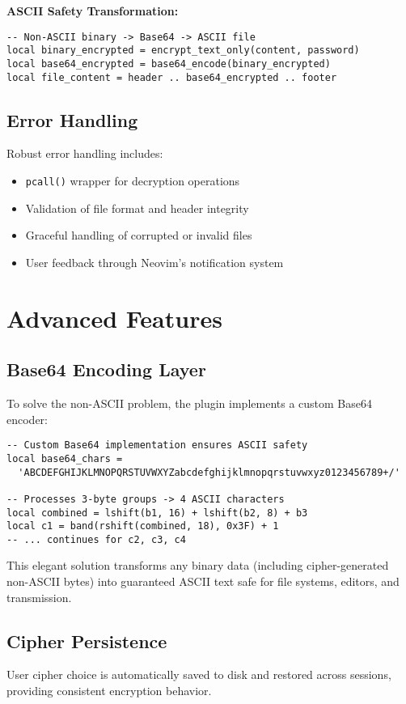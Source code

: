 \documentclass[11pt,a4paper]{article}
\begin{document}
\begin{multicols}{2}
\textbf{ASCII Safety Transformation:}
\begin{lstlisting}[basicstyle=\ttfamily\tiny]
-- Non-ASCII binary -> Base64 -> ASCII file
local binary_encrypted = encrypt_text_only(content, password)
local base64_encrypted = base64_encode(binary_encrypted)
local file_content = header .. base64_encrypted .. footer
\end{lstlisting}

\subsection{Error Handling}
Robust error handling includes:
\begin{itemize}
    \item \texttt{pcall()} wrapper for decryption operations
    \item Validation of file format and header integrity
    \item Graceful handling of corrupted or invalid files
    \item User feedback through Neovim's notification system
\end{itemize}

\section{Advanced Features}

\subsection{Base64 Encoding Layer}
To solve the non-ASCII problem, the plugin implements a custom Base64 encoder:
\begin{lstlisting}[basicstyle=\ttfamily\tiny]
-- Custom Base64 implementation ensures ASCII safety
local base64_chars = 
  'ABCDEFGHIJKLMNOPQRSTUVWXYZabcdefghijklmnopqrstuvwxyz0123456789+/'

-- Processes 3-byte groups -> 4 ASCII characters
local combined = lshift(b1, 16) + lshift(b2, 8) + b3
local c1 = band(rshift(combined, 18), 0x3F) + 1
-- ... continues for c2, c3, c4
\end{lstlisting}

This elegant solution transforms any binary data (including cipher-generated non-ASCII bytes) into guaranteed ASCII text safe for file systems, editors, and transmission.

\subsection{Cipher Persistence}
User cipher choice is automatically saved to disk and restored across sessions, providing consistent encryption behavior.


\end{multicols}
\end{document}
